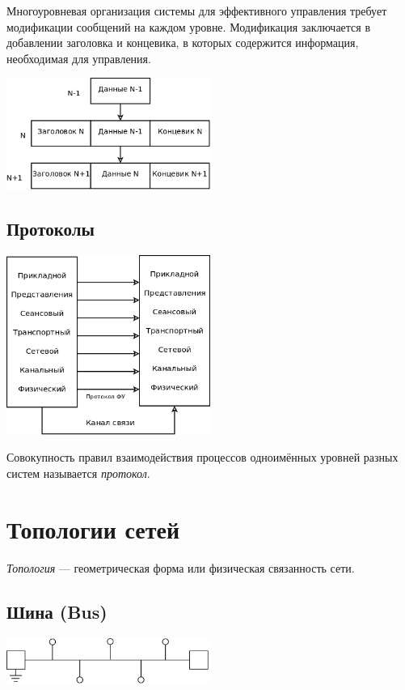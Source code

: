 \documentclass[12pt, russian, oneside, article]{ncc}
\begin{document}
Многоуровневая организация системы для эффективного управления требует модификации сообщений на каждом уровне. Модификация заключается в добавлении заголовка и концевика, в которых содержится информация, необходимая для управления.

\includegraphics[width=0.5\textwidth]{images/SiSPI/mess_strucr.png}
\subsection{Протоколы}
\label{sec-1_5}


\includegraphics[width=0.5\textwidth]{images/SiSPI/protocol.png}

Совокупность правил взаимодействия процессов одноимённых уровней разных систем называется \emph{протокол}.
\section{Топологии сетей}
\label{sec-2}


\emph{Топология} --- геометрическая форма или физическая связанность сети.
\subsection{Шина (Bus)}
\label{sec-2_1}


\includegraphics[width=0.5\textwidth]{images/SiSPI/bus.png}
\end{document}
